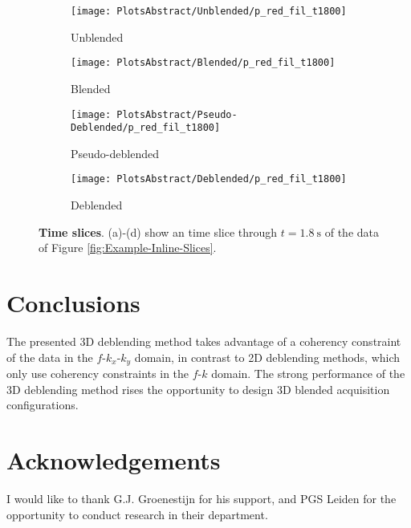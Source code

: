 \documentclass{madrid15WS}
\begin{document}
\begin{figure}[h!]
	\centering
	\begin{subfigure}[t]{0.4\textwidth}
		\centering
		\texttt{[image: PlotsAbstract/Unblended/p\_red\_fil\_t1800]}
		\caption{Unblended}
		\label{fig:Example-Unblendedt}
	\end{subfigure}
	\centering
	\begin{subfigure}[t]{0.4\textwidth}
		\centering
		\texttt{[image: PlotsAbstract/Blended/p\_red\_fil\_t1800]}
		\caption{Blended}
		\label{fig:Example-Blendedt}
	\end{subfigure}
	
	\centering
	\begin{subfigure}[t]{0.4\textwidth}
		\centering
		\texttt{[image: PlotsAbstract/Pseudo-Deblended/p\_red\_fil\_t1800]} %
		\caption{Pseudo-deblended}
		\label{fig:Example-Pseudot}
	\end{subfigure}
	\centering
	\begin{subfigure}[t]{0.4\textwidth}
		\centering
		\texttt{[image: PlotsAbstract/Deblended/p\_red\_fil\_t1800]} %
		\caption{Deblended}
		\label{fig:Example-Deblendedt}
	\end{subfigure}
		
	\caption{\textbf{Time slices}. (a)-(d) show an time slice through $t = \SI{1.8}{\second}$ of the data of Figure \ref{fig:Example-Inline-Slices}.}
	\label{fig:Example-Time-Slices}

\end{figure}



\section{Conclusions}

The presented 3D deblending method takes advantage of a coherency constraint of the data in the $f$-$k_x$-$k_y$ domain, in contrast to 2D deblending methods, which only use coherency constraints in the $f$-$k$ domain. The strong performance of the 3D deblending method rises the opportunity to design 3D blended acquisition configurations.

\section{Acknowledgements}
I would like to thank G.J. Groenestijn for his support, and PGS Leiden for the opportunity to conduct research in their department.


%
%
% 


\end{document}
